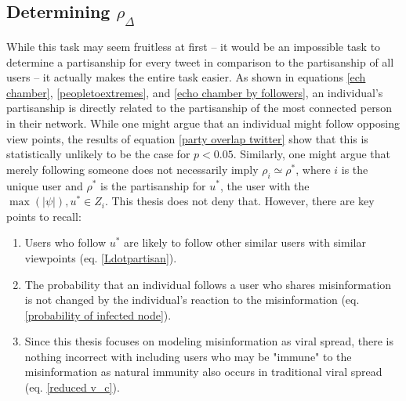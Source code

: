 \documentclass[NETN,manuscript]{stjour-new}
\begin{document}
\subsection{Determining $\rho_{\Delta}$}
While this task may seem fruitless at first -- it would be an impossible task to determine a partisanship for every tweet in comparison to the partisanship of all users -- it actually makes the entire task easier. As shown in equations \ref{ech chamber}, \ref{peopletoextremes}, and \ref{echo chamber by followers}, an individual's partisanship is directly related to the partisanship of the most connected person in their network. While one might argue that an individual might follow opposing view points, the results of equation \ref{party overlap twitter} show that this is statistically unlikely to be the case for $p < 0.05$. Similarly, one might argue that merely following someone does not necessarily imply $\rho_i \simeq \rho^*$, where $i$ is the unique user and $\rho^*$ is the partisanship for $u^*$, the user with the $\max(|\psi|), u^* \in Z_i$. This thesis does not deny that. However, there are key points to recall:
\begin{enumerate}
    \item Users who follow $u^*$ are likely to follow other similar users with similar viewpoints (eq. \ref{Ldotpartisan}).
    \item The probability that an individual follows a user who shares misinformation is not changed by the individual's reaction to the misinformation (eq. \ref{probability of infected node}).
    \item Since this thesis focuses on modeling misinformation as viral spread, there is nothing incorrect with including users who may be "immune" to the misinformation as natural immunity also occurs in traditional viral spread (eq. \ref{reduced v_c}).
\end{enumerate}



\newpage









\end{document}
